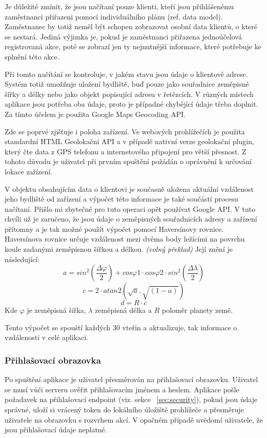 \documentclass[
  glossaries,
]{kidiplom}
\begin{document}
Je důležité zmínit, že jsou načítaní pouze klienti, kteří jsou přihlášenému zaměstnanci přiřazeni pomocí individuálního plánu (ref. data model). Zaměstnanec by totiž neměl být schopen zobrazovat osobní data klientů, o které se nestará. Jediná výjimka je, pokud je zaměstnanci přiřazena jednoúčelová registrovaná akce, poté se zobrazí jen ty nejnutnější informace, které potřebuje ke splnění této akce.

Při tomto načítání se kontroluje, v jakém stavu jsou údaje o klientově adrese. Systém totiž umožňuje uložení bydliště, buď pouze jako souřadnice zeměpisné šířky a délky nebo jako objekt popisující adresu v řetězcích. V různých místech aplikace jsou potřeba oba údaje, proto je případné chybějící údaje třeba doplnit. Za tímto účelem je použita Google Maps Geocoding API. 

Zde se poprvé zjišťuje i poloha zařízení. Ve webových prohlížečích je použita standardní HTML Geolokační API a v případě nativní verze geolokační plugin, který čte data z GPS telefonu a internetového připojení pro větší přesnost. Z tohoto důvodu je uživatel při prvním spuštění požádán o oprávnění k určování lokace zařízení.

V objektu obsahujícím data o klientovi je současně uložena aktuální vzdálenost jeho bydliště od zařízení a výpočet této informace je také součástí procesu načítaní. Přišlo mi zbytečné pro tuto operaci opět používat Google API. V tuto chvíli už je zaručeno, že jsou údaje o zeměpisných souřadnicích adresy a zařízení přítomny a je tak možné použít výpočet pomocí Haversínovy rovnice. Haversínova rovnice určuje vzdálenost mezi dvěma body ležícími na povrchu koule zadanými zeměpisnou šířkou a délkou. \cite{16} \textit{(volný překlad)} Její znění \cite{17} je následující:
$$a = sin^2(\frac{\Delta\varphi}{2}) + cos\varphi1 \cdot cos\varphi2 \cdot sin^2(\frac{\Delta\lambda}{2})$$
$$c = 2 \cdot atan2(\sqrt{a},\sqrt{(1 - a)})$$
$$ d = R \cdot c$$
Kde $\varphi$ je zeměpisná šířka, $\lambda$ zeměpisná délka a $R$ poloměr planety země.

 Tento výpočet se spouští každých 30 vteřin a aktualizuje, tak informace o vzdálenosti v celé aplikaci.

\subsubsection{Přihlašovací obrazovka}
Po spuštění aplikace je uživatel přesměrován na přihlašovací obrazovku. Uživatel se musí  vůči serveru ověřit přihlašovacím jménem a heslem. Aplikace pošle požadavek na přihlašovací endpoint (viz. sekce ~\ref{sec:security}), pokud jsou údaje správné, uloží si vrácený token do lokálního úložiště prohlížeče a přesměruje uživatele na obrazovku s rozvrhem akcí. V opačném případě uvědomí uživatele, že jsou přihlašovací údaje neplatné.
  
\end{document}
